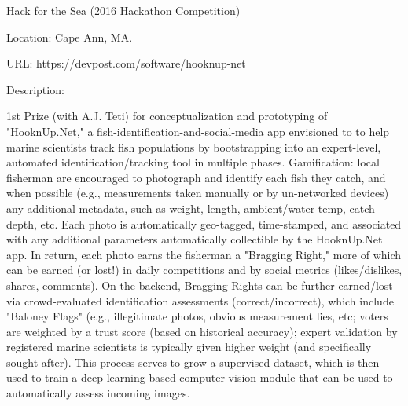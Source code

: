 
Hack for the Sea (2016 Hackathon Competition)

Location: Cape Ann, MA.

URL: https://devpost.com/software/hooknup-net

Description:

1st Prize (with A.J. Teti) for  conceptualization and prototyping 
of "HooknUp.Net," a fish-identification-and-social-media app
envisioned to to help marine scientists track fish populations
by bootstrapping into an expert-level, automated
identification/tracking tool in multiple phases. Gamification: local
fisherman are encouraged to photograph and identify each fish
they catch, and when possible (e.g., measurements taken manually or 
by un-networked devices) any additional metadata, such as 
weight, length, ambient/water temp, catch depth, etc. Each photo 
is automatically geo-tagged, time-stamped, and associated
with any additional parameters automatically collectible by the HooknUp.Net 
app. In return, each photo earns the fisherman a "Bragging Right," more of which 
can be earned (or lost!) in daily competitions and by social metrics 
(likes/dislikes, shares, comments). On the backend, Bragging
Rights can be further earned/lost via crowd-evaluated identification
assessments (correct/incorrect), which include "Baloney Flags" (e.g., 
illegitimate photos, obvious measurement lies, etc; voters are weighted 
by a trust score (based on historical accuracy); expert validation 
by registered marine scientists is typically given higher weight
(and specifically sought after). This process serves to grow a supervised 
dataset, which is then used to train a deep learning-based
computer vision module that can be used to automatically assess
incoming images.
